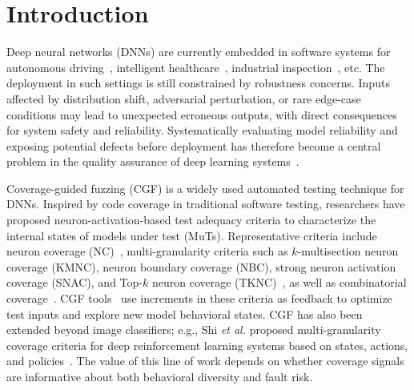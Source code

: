 \documentclass[preprint,number,5p,twocolumn]{elsarticle}
\begin{document}
\section{Introduction}

\par Deep neural networks (DNNs) are currently embedded in software systems for autonomous driving~\cite{MoussaMA26}, intelligent healthcare~\cite{KhanSTGSZAA26}, industrial inspection~\cite{ZhangHZSSXW26}, etc. The deployment in such settings is still constrained by robustness concerns. Inputs affected by distribution shift, adversarial perturbation, or rare edge-case conditions may lead to unexpected erroneous outputs, with direct consequences for system safety and reliability. Systematically evaluating model reliability and exposing potential defects before deployment has therefore become a central problem in the quality assurance of deep learning systems~\cite{HuangKRSSTWY20, RiccioJSHWT20, ZhangHML22}.

\par Coverage-guided fuzzing (CGF) is a widely used automated testing technique for DNNs. Inspired by code coverage in traditional software testing, researchers have proposed neuron-activation-based test adequacy criteria to characterize the internal states of models under test (MuTs). Representative criteria include neuron coverage (NC)~\cite{PeiCYJ19}, multi-granularity criteria such as $k$-multisection neuron coverage (KMNC), neuron boundary coverage (NBC), strong neuron activation coverage (SNAC), and Top-$k$ neuron coverage (TKNC)~\cite{MaJZSXLCSLLZW18}, as well as combinatorial coverage~\cite{MaJXLLLZ19}. CGF tools~\cite{OdenaOAG19, GuoJZCS18, XieMJXCLZLYS19} use increments in these criteria as feedback to optimize test inputs and explore new model behavioral states. CGF has also been extended beyond image classifiers; e.g., Shi \emph{et al.} proposed multi-granularity coverage criteria for deep reinforcement learning systems based on states, actions, and policies~\cite{ShiYZ24}. The value of this line of work depends on whether coverage signals are informative about both behavioral diversity and fault risk.
\end{document}
